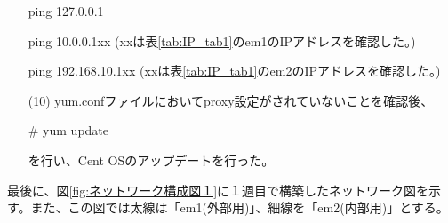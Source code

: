 \documentclass[12pt,a4paper]{jsarticle}
\numberwithin{equation}{section}
\numberwithin{figure}{section}
\numberwithin{table}{section}
\begin{document}
\begin{itemize}
          \begin{screen}ping 127.0.0.1\end{screen}
          \begin{screen}ping 10.0.0.1xx (xxは表\ref{tab:IP_tab1}のem1のIPアドレスを確認した。)\end{screen}
          \begin{screen}ping 192.168.10.1xx (xxは表\ref{tab:IP_tab1}のem2のIPアドレスを確認した。)\end{screen}
          \begin{table}[H]
            \caption{各種サーバのIPアドレス(1週目)}\label{tab:IP_tab1}
            \begin{center}
            \end{center}
            \end{table}
      \item [(10)]yum.confファイルにおいてproxy設定がされていないことを確認後、
      \begin{screen}
        \# yum update 
      \end{screen}
      を行い、Cent OSのアップデートを行った。
    \end{itemize}
    \newpage
    最後に、図\ref{fig:ネットワーク構成図１}に１週目で構築したネットワーク図を示す。また、この図では太線は「em1(外部用)」、細線を「em2(内部用)」とする。
\end{document}
